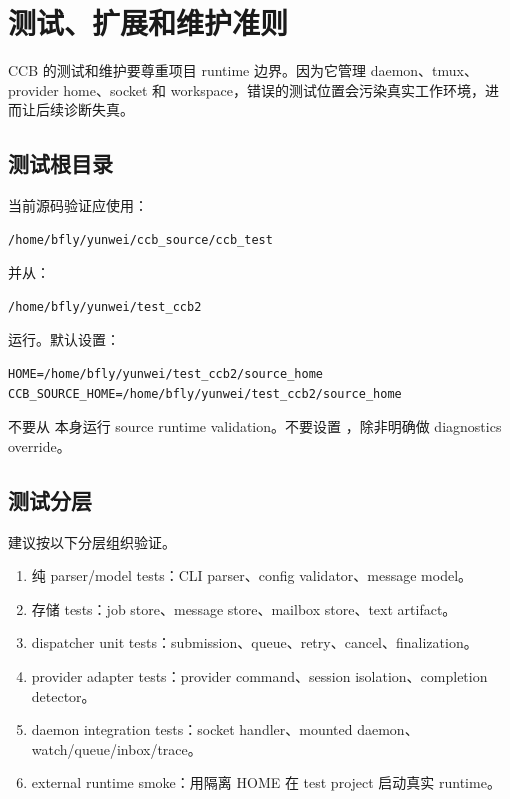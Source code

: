 \chapter{测试、扩展和维护准则}

CCB 的测试和维护要尊重项目 runtime 边界。因为它管理 daemon、tmux、provider home、socket 和 workspace，错误的测试位置会污染真实工作环境，进而让后续诊断失真。

\section{测试根目录}

当前源码验证应使用：

\begin{lstlisting}
/home/bfly/yunwei/ccb_source/ccb_test
\end{lstlisting}

并从：

\begin{lstlisting}
/home/bfly/yunwei/test_ccb2
\end{lstlisting}

运行。默认设置：

\begin{lstlisting}
HOME=/home/bfly/yunwei/test_ccb2/source_home
CCB_SOURCE_HOME=/home/bfly/yunwei/test_ccb2/source_home
\end{lstlisting}

不要从  本身运行 source runtime validation。不要设置 ，除非明确做 diagnostics override。

\section{测试分层}

建议按以下分层组织验证。

\begin{enumerate}
  \item 纯 parser/model tests：CLI parser、config validator、message model。
  \item 存储 tests：job store、message store、mailbox store、text artifact。
  \item dispatcher unit tests：submission、queue、retry、cancel、finalization。
  \item provider adapter tests：provider command、session isolation、completion detector。
  \item daemon integration tests：socket handler、mounted daemon、watch/queue/inbox/trace。
  \item external runtime smoke：用隔离 HOME 在 test project 启动真实 runtime。
\end{enumerate}

